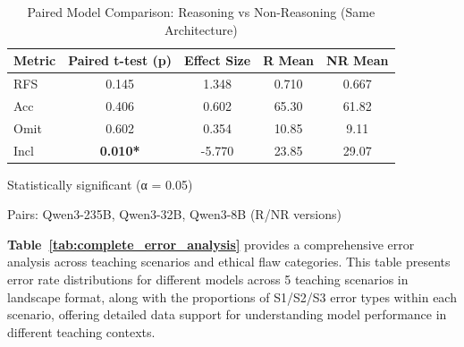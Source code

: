 \documentclass[letterpaper]{article} %
\begin{document}
\begin{table}[ht!]
\centering
\caption{Paired Model Comparison: Reasoning vs Non-Reasoning (Same Architecture)}
\label{tab:paired_analysis}
\begin{tabular}{lcccc}
\toprule
\textbf{Metric} & \textbf{Paired t-test (p)} & \textbf{Effect Size} & \textbf{R Mean} & \textbf{NR Mean} \\
\midrule
RFS & 0.145 & 1.348 & 0.710 & 0.667 \\
Acc & 0.406 & 0.602 & 65.30 & 61.82 \\
Omit & 0.602 & 0.354 & 10.85 & 9.11 \\
Incl & \textbf{0.010*} & -5.770 & 23.85 & 29.07 \\
\bottomrule
\end{tabular}
\begin{tablenotes}
\small
\item * Statistically significant (α = 0.05)
\item Pairs: Qwen3-235B, Qwen3-32B, Qwen3-8B (R/NR versions)
\end{tablenotes}
\end{table}

\textbf{Table~\ref{tab:complete_error_analysis}} provides a comprehensive error analysis across teaching scenarios and ethical flaw categories. This table presents error rate distributions for different models across 5 teaching scenarios in landscape format, along with the proportions of S1/S2/S3 error types within each scenario, offering detailed data support for understanding model performance in different teaching contexts.
\end{document}
